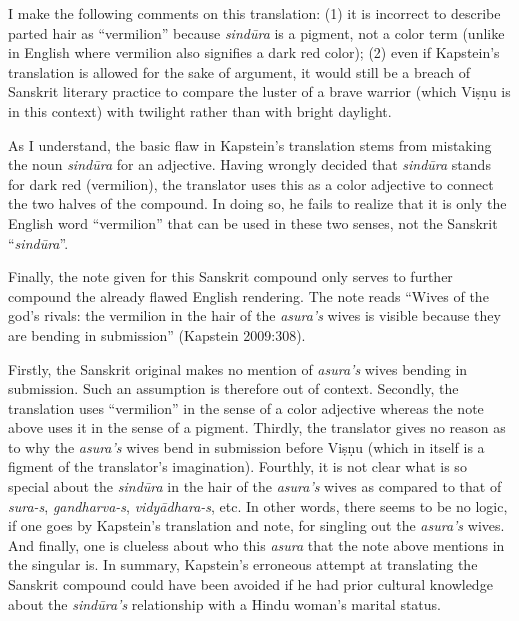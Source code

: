 I make the following comments on this translation: (1) it is incorrect to describe parted hair as “vermilion” because \textsl{sindūra} is a pigment, not a color term (unlike in English where vermilion also signifies a dark red color); (2) even if Kapstein’s translation is allowed for the sake of argument, it would still be a breach of Sanskrit literary practice to compare the luster of a brave warrior (which Viṣṇu is in this context) with twilight rather than with bright daylight. 

As I understand, the basic flaw in Kapstein’s translation stems from mistaking the noun \textsl{sindūra} for an adjective. Having wrongly decided that \textsl{sindūra} stands for dark red (vermilion), the translator uses this as a color adjective to connect the two halves of the compound. In doing so, he fails to realize that it is only the English word “vermilion” that can be used in these two senses, not the Sanskrit “\textsl{sindūra}”.

Finally, the note given for this Sanskrit compound only serves to further compound the already flawed English rendering. The note reads “Wives of the god’s rivals: the vermilion in the hair of the \textsl{asura’s }wives is visible because they are bending in submission” (Kapstein 2009:308). 

\newpage

Firstly, the Sanskrit original makes no mention of \textsl{asura’s} wives bending in submission. Such an assumption is therefore out of context. Secondly, the translation uses “vermilion” in the sense of a color adjective whereas the note above uses it in the sense of a pigment. Thirdly, the translator gives no reason as to why the \textsl{asura’s} wives bend in submission before Viṣṇu (which in itself is a figment of the translator’s imagination). Fourthly, it is not clear what is so special about the \textsl{sindūra} in the hair of the \textsl{asura’s} wives as compared to that of \textsl{sura-s}, \textsl{gandharva-s}, \textsl{vidyādhara-s}, etc. In other words, there seems to be no logic, if one goes by Kapstein’s translation and note, for singling out the \textsl{asura’s} wives. And finally, one is clueless about who this \textsl{asura} that the note above mentions in the singular is. In summary, Kapstein’s erroneous attempt at translating the Sanskrit compound could have been avoided if he had prior cultural knowledge about the \textsl{sindūra’s} relationship with a Hindu woman’s marital status.

